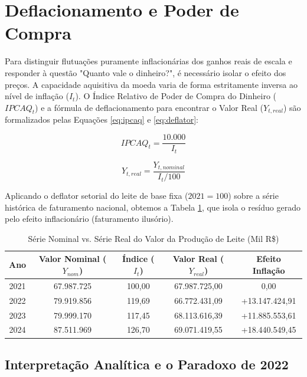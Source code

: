 \documentclass[12pt,a4paper]{article}
\begin{document}
\section{Deflacionamento e Poder de Compra}

Para distinguir flutuações puramente inflacionárias dos ganhos reais de escala e responder à questão "Quanto vale o dinheiro?", é necessário isolar o efeito dos preços. A capacidade aquisitiva da moeda varia de forma estritamente inversa ao nível de inflação ($I_t$). O Índice Relativo de Poder de Compra do Dinheiro ($IPCAQ_t$) e a fórmula de deflacionamento para encontrar o Valor Real ($Y_{t,real}$) são formalizados pelas Equações \ref{eq:ipcaq} e \ref{eq:deflator}:

{\small
\begin{equation} \label{eq:ipcaq}
IPCAQ_t = \frac{10.000}{I_t}
\end{equation}

\begin{equation} \label{eq:deflator}
Y_{t,real} = \frac{Y_{t,nominal}}{I_t/100}
\end{equation}
}

Aplicando o deflator setorial do leite de base fixa ($2021 = 100$) sobre a série histórica de faturamento nacional, obtemos a Tabela \ref{tab:deflacionamento}, que isola o resíduo gerado pelo efeito inflacionário (faturamento ilusório).

\begin{table}[h]
\centering
\small
\caption{Série Nominal vs. Série Real do Valor da Produção de Leite (Mil R\$)}
\label{tab:deflacionamento}
\begin{tabular}{ccccc}
\toprule
Ano & Valor Nominal ($Y_{nom}$) & Índice ($I_t$) & Valor Real ($Y_{real}$) & Efeito Inflação \\
\midrule
2021 & 67.987.725 & 100,00 & 67.987.725,00 & 0,00 \\
2022 & 79.919.856 & 119,69 & 66.772.431,09 & +13.147.424,91 \\
2023 & 79.999.170 & 117,45 & 68.113.616,39 & +11.885.553,61 \\
2024 & 87.511.969 & 126,70 & 69.071.419,55 & +18.440.549,45 \\
\bottomrule
\end{tabular}
\end{table}

\subsection{Interpretação Analítica e o Paradoxo de 2022}
\end{document}
